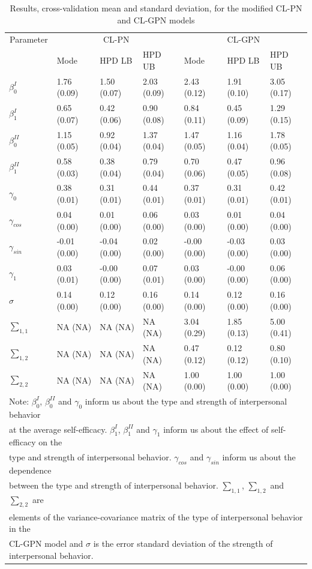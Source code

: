 \documentclass[man]{apa6}
\begin{document}
\begin{table}

\caption{\label{tab:estCLGPN}Results, cross-validation mean and standard deviation, for the modified CL-PN and CL-GPN models}
\centering
\begin{tabular}[t]{lllllll}
\toprule
\multicolumn{1}{c}{Parameter} & \multicolumn{3}{c}{CL-PN} & \multicolumn{3}{c}{CL-GPN} \\
\cmidrule(l{2pt}r{2pt}){1-1} \cmidrule(l{2pt}r{2pt}){2-4} \cmidrule(l{2pt}r{2pt}){5-7}
  & Mode & HPD LB & HPD UB & Mode & HPD LB & HPD UB\\
\midrule
$\beta_0^{I}$ & 1.76 (0.09) & 1.50 (0.07) & 2.03 (0.09) & 2.43 (0.12) & 1.91 (0.10) & 3.05 (0.17)\\
$\beta_1^{I}$ & 0.65 (0.07) & 0.42 (0.06) & 0.90 (0.08) & 0.84 (0.11) & 0.45 (0.09) & 1.29 (0.15)\\
$\beta_0^{II}$ & 1.15 (0.05) & 0.92 (0.04) & 1.37 (0.04) & 1.47 (0.05) & 1.16 (0.04) & 1.78 (0.05)\\
$\beta_1^{II}$ & 0.58 (0.03) & 0.38 (0.04) & 0.79 (0.04) & 0.70 (0.06) & 0.47 (0.05) & 0.96 (0.08)\\
$\gamma_0$ & 0.38 (0.01) & 0.31 (0.01) & 0.44 (0.01) & 0.37 (0.01) & 0.31 (0.01) & 0.42 (0.01)\\
\addlinespace
$\gamma_{cos}$ & 0.04 (0.00) & 0.01 (0.00) & 0.06 (0.00) & 0.03 (0.00) & 0.01 (0.00) & 0.04 (0.00)\\
$\gamma_{sin}$ & -0.01 (0.00) & -0.04 (0.00) & 0.02 (0.00) & -0.00 (0.00) & -0.03 (0.00) & 0.03 (0.00)\\
$\gamma_1$ & 0.03 (0.01) & -0.00 (0.00) & 0.07 (0.01) & 0.03 (0.00) & -0.00 (0.00) & 0.06 (0.00)\\
$\sigma$ & 0.14 (0.00) & 0.12 (0.00) & 0.16 (0.00) & 0.14 (0.00) & 0.12 (0.00) & 0.16 (0.00)\\
$\sum_{1,1}$ & NA (NA) & NA (NA) & NA (NA) & 3.04 (0.29) & 1.85 (0.13) & 5.00 (0.41)\\
\addlinespace
$\sum_{1,2}$ & NA (NA) & NA (NA) & NA (NA) & 0.47 (0.12) & 0.12 (0.12) & 0.80 (0.10)\\
$\sum_{2,2}$ & NA (NA) & NA (NA) & NA (NA) & 1.00 (0.00) & 1.00 (0.00) & 1.00 (0.00)\\
\bottomrule
\multicolumn{7}{l}{Note: $\beta_0^{I}$, $\beta_0^{II}$ and $\gamma_0$ inform us about the type and strength of interpersonal behavior}\\
\multicolumn{7}{l}{at the average self-efficacy. $\beta_1^{I}$, $\beta_1^{II}$ and $\gamma_1$ inform us about the effect of self-efficacy on the}\\
\multicolumn{7}{l}{type and strength of interpersonal behavior. $\gamma_{cos}$ and $\gamma_{sin}$ inform us about the dependence}\\
\multicolumn{7}{l}{ between the type and strength of interpersonal behavior. $\sum_{1,1}$, $\sum_{1,2}$ and $\sum_{2,2}$ are}\\
\multicolumn{7}{l}{elements of the variance-covariance matrix of the type of interpersonal behavior in the}\\
\multicolumn{7}{l}{CL-GPN model and $\sigma$ is the error standard deviation of the strength of interpersonal behavior.}\\


\end{tabular}
\end{table}
\end{document}
